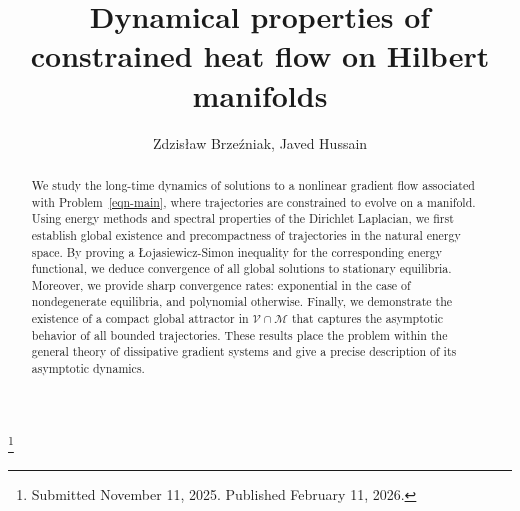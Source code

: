 \documentclass[reqno]{amsart}
\begin{document}
\title[\hfilneg EJDE-2026/13\hfil Heat flow on Hilbert manifolds]
{Dynamical properties of constrained heat flow on Hilbert manifolds}

\author[Z. Brzezniak, J. Hussain \hfil EJDE-2026/13\hfilneg]
{Zdzis\l{a}w Brze\'zniak, Javed Hussain}

\address{Zdzis\l{a}w Brzez\'niak  \newline
University of York,
Department of Mathematics,
United Kingdom}

\address{Javed Hussain \newline
Sukkur IBA University,
Department of Mathematics,
Pakistan}

\thanks{Submitted November 11, 2025. Published February 11, 2026.}

\begin{abstract}
We study the long-time dynamics of solutions to a nonlinear gradient flow associated
with Problem~\eqref{eqn-main}, where trajectories are constrained to evolve on a
manifold. Using energy methods and spectral properties of the Dirichlet Laplacian,
we first establish global existence and precompactness of trajectories in the natural
energy space. By proving a \L{o}jasiewicz-Simon inequality for the corresponding
energy functional, we deduce convergence of all global solutions to stationary
equilibria. Moreover, we provide sharp convergence rates: exponential in the case
of nondegenerate equilibria, and polynomial otherwise. Finally, we demonstrate the
existence of a compact global attractor in $\mathcal{V}\cap\mathcal{M}$ that
captures the asymptotic behavior of all bounded trajectories.
These results place the problem within the general theory of dissipative gradient
systems and give a precise description of its asymptotic dynamics.
\end{abstract}

\maketitle
{}
\newtheorem{theorem}{Theorem}[section]
\newtheorem{lemma}[theorem]{Lemma}
\newtheorem{corollary}[theorem]{Corollary}
\newtheorem{definition}[theorem]{Definition}
\newtheorem{remark}[theorem]{Remark}
\allowdisplaybreaks
\end{document}
